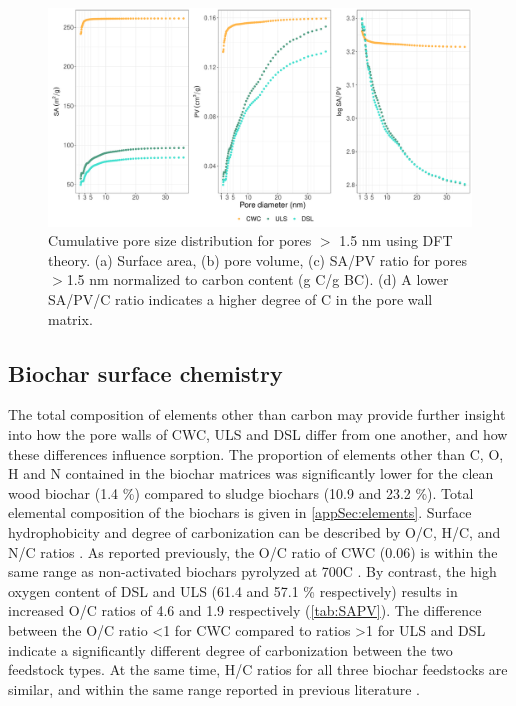 \begin{figure}[htb]
    \centering
    \includegraphics[width=\textwidth]{R/figs/PZD_SAPV_C_large.pdf}
    \caption{Cumulative pore size distribution for pores $>$ 1.5 nm using DFT theory. (a) Surface area, (b) pore volume, (c) SA/PV ratio for pores $>$1.5 nm normalized to carbon content (g C/g BC). (d) A lower SA/PV/C ratio indicates a higher degree of C in the pore wall matrix.}
    \label{fig:PZD_large}
\end{figure}

\subsection{Biochar surface chemistry}
The total composition of elements other than carbon may provide further insight into how the pore walls of CWC, ULS and DSL differ from one another, and how these differences influence sorption. The proportion of elements other than C, O, H and N contained in the biochar matrices was significantly lower for the clean wood biochar (1.4 \%) compared to sludge biochars (10.9 and 23.2 \%). Total elemental composition of the biochars is given in \cref{appSec:elements}. Surface hydrophobicity and degree of carbonization can be described by O/C, H/C, and N/C ratios \citep{chun2004compositions}. As reported previously, the O/C ratio of CWC (0.06) is within the same range as non-activated biochars pyrolyzed at 700\textdegree C \citep{LehmannAndJoseph2015, chun2004compositions,kupryianchyk2016biochar}. By contrast, the high oxygen content of DSL and ULS (61.4 and 57.1 \% respectively) results in increased O/C ratios of 4.6 and 1.9 respectively (\cref{tab:SAPV}). The difference between the O/C ratio \textless 1 for CWC compared to ratios \textgreater 1 for ULS and DSL indicate a significantly different degree of carbonization between the two feedstock types. At the same time, H/C ratios for all three biochar feedstocks are similar, and within the same range reported in previous literature \citep{chun2004compositions,kupryianchyk2016biochar}. 


